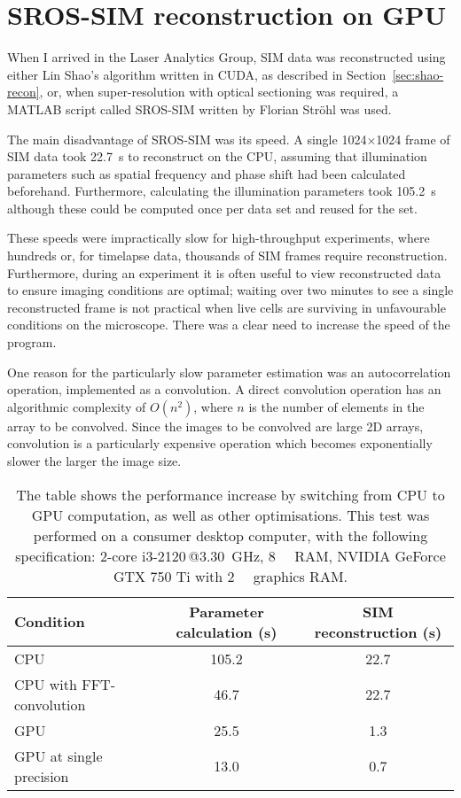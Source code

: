 \section{SROS-SIM reconstruction on GPU} \label{appx:gpu-srossim}
When I arrived in the Laser Analytics Group, SIM data was reconstructed using either Lin Shao's algorithm written in CUDA, as described in Section~\ref{sec:shao-recon}, or, when super-resolution with optical sectioning was required, a MATLAB script called SROS-SIM written by Florian Str{\"o}hl was used. 

The main disadvantage of SROS-SIM was its speed. 
A single 1024$\times$1024 frame of SIM data took \SI{22.7}{\second} to reconstruct on the CPU, assuming that illumination parameters such as spatial frequency and phase shift had been calculated beforehand. 
Furthermore, calculating the illumination parameters took \SI{105.2}{\second} although these could be computed once per data set and reused for the set. 

These speeds were impractically slow for high-throughput experiments, where hundreds or, for timelapse data, thousands of SIM frames require reconstruction. 
Furthermore, during an experiment it is often useful to view reconstructed data to ensure imaging conditions are optimal; waiting over two minutes to see a single reconstructed frame is not practical when live cells are surviving in unfavourable conditions on the microscope. 
There was a clear need to increase the speed of the program.

One reason for the particularly slow parameter estimation was an autocorrelation operation, implemented as a convolution.
A direct convolution operation has an algorithmic complexity of $O(n^2)$, where $n$ is the number of elements in the array to be convolved. 
Since the images to be convolved are large 2D arrays, convolution is a particularly expensive operation which becomes exponentially slower the larger the image size. 

\begin{table}[b]
\caption[SROS-SIM reconstruction is 32X faster on the GPU than the CPU]{\label{tab:reconPerformance}The table shows the performance increase by switching from CPU to GPU computation, as well as other optimisations. This test was performed on a consumer desktop computer, with the following specification: 2-core i3-2120\,@\SI{3.30}{\giga\hertz}, \SI{8}{\giga\byte} RAM, NVIDIA GeForce GTX 750 Ti with \SI{2}{\giga\byte} graphics RAM.}
\centering
\begin{tabular}{|l|c|c|}
\hline
\textbf{Condition} & \textbf{Parameter calculation (s)} & \textbf{SIM reconstruction (s)} \\ \hline
CPU & 105.2 & 22.7 \\
CPU with FFT-convolution & 46.7 & 22.7 \\
GPU & 25.5 & 1.3 \\
GPU at single precision & 13.0 & 0.7 \\
\hline

\end{tabular}
\end{table}

